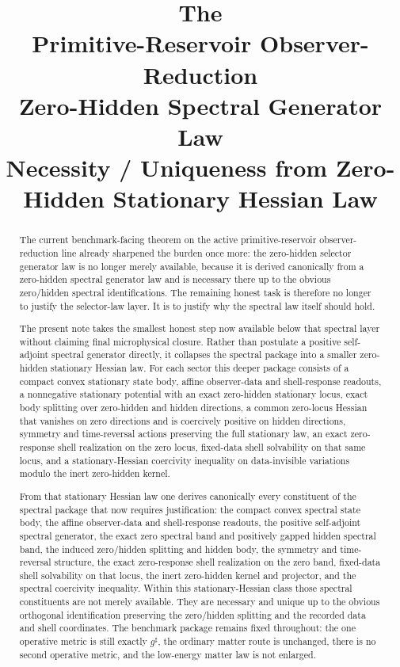 \documentclass[11pt]{article}
\title{\textbf{The \TheoryName{}}\\[0.4em]
\large Primitive-Reservoir Observer-Reduction\\
\large Zero-Hidden Spectral Generator Law\\
\large Necessity / Uniqueness from Zero-Hidden Stationary Hessian Law}
\author{}
\date{}
\newcommand{\CompletedMetric}{g^{\sharp}}
\begin{document}
\maketitle

\begin{abstract}
The current benchmark-facing theorem on the active primitive-reservoir observer-reduction line already sharpened the burden once more: the zero-hidden selector generator law is no longer merely available, because it is derived canonically from a zero-hidden spectral generator law and is necessary there up to the obvious zero/hidden spectral identifications. The remaining honest task is therefore no longer to justify the selector-law layer. It is to justify why the spectral law itself should hold.

The present note takes the smallest honest step now available below that spectral layer without claiming final microphysical closure. Rather than postulate a positive self-adjoint spectral generator directly, it collapses the spectral package into a smaller zero-hidden stationary Hessian law. For each sector this deeper package consists of a compact convex stationary state body, affine observer-data and shell-response readouts, a nonnegative stationary potential with an exact zero-hidden stationary locus, exact body splitting over zero-hidden and hidden directions, a common zero-locus Hessian that vanishes on zero directions and is coercively positive on hidden directions, symmetry and time-reversal actions preserving the full stationary law, an exact zero-response shell realization on the zero locus, fixed-data shell solvability on that same locus, and a stationary-Hessian coercivity inequality on data-invisible variations modulo the inert zero-hidden kernel.

From that stationary Hessian law one derives canonically every constituent of the spectral package that now requires justification: the compact convex spectral state body, the affine observer-data and shell-response readouts, the positive self-adjoint spectral generator, the exact zero spectral band and positively gapped hidden spectral band, the induced zero/hidden splitting and hidden body, the symmetry and time-reversal structure, the exact zero-response shell realization on the zero band, fixed-data shell solvability on that locus, the inert zero-hidden kernel and projector, and the spectral coercivity inequality. Within this stationary-Hessian class those spectral constituents are not merely available. They are necessary and unique up to the obvious orthogonal identification preserving the zero/hidden splitting and the recorded data and shell coordinates. The benchmark package remains fixed throughout: the one operative metric is still exactly \(\CompletedMetric\), the ordinary matter route is unchanged, there is no second operative metric, and the low-energy matter law is not enlarged.
\end{abstract}
\end{document}
